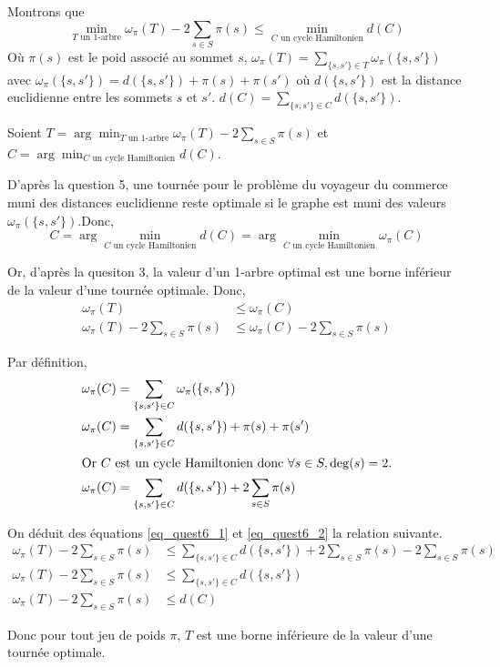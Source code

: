 Montrons que
\begin{equation}\label{eq_quest6}
\min_{T \text{ un 1-arbre}} \omega_{\pi}(T) - 2 \sum_{s \in S} \pi(s) \leq \min_{C \text{ un cycle Hamiltonien}} d(C)
\end{equation}
Où $ \pi(s) $ est le poid associé au sommet $ s $, $ \omega_{\pi}(T) = \sum_{\{s,s'\} \in T} \omega_{\pi}(\{s, s'\}) $ avec $ \omega_{\pi}(\{s, s'\}) = d(\{s, s'\}) + \pi(s) + \pi(s') $ où $ d(\{s, s'\}) $ est la distance euclidienne entre les sommets $ s $ et $ s' $. $ d(C) = \sum_{\{s,s'\} \in C} d(\{s, s'\}) $.

Soient $ T = \arg\min_{T \text{ un 1-arbre}} \omega_{\pi}(T) - 2 \sum_{s \in S} \pi(s)$ et $ C = \arg\min_{C \text{ un cycle Hamiltonien}} d(C) $.

D'après la question 5, une tournée pour le problème du voyageur du commerce muni des distances euclidienne reste optimale si le graphe est muni des valeurs $ \omega_{\pi}(\{s, s'\}) $.Donc,
\begin{equation}
C = \arg\min_{C \text{ un cycle Hamiltonien}} d(C) = \arg\min_{C \text{ un cycle Hamiltonien}} \omega_{\pi}(C)
\end{equation}

Or, d'après la quesiton 3, la valeur d'un 1-arbre optimal est une borne inférieur de la valeur d'une tournée optimale. Donc,
\begin{align}
	\omega_{\pi}(T)                           & \leq \omega_{\pi}(C)                           \\
	\omega_{\pi}(T) - 2 \sum_{s \in S} \pi(s) & \leq \omega_{\pi}(C) - 2 \sum_{s \in S} \pi(s) \label{eq_quest6_1}
\end{align}

Par définition,
\begin{align}
	\omega_{\pi}(C) & =  \sum_{\{s,s'\} \in C} \omega_{\pi}(\{s, s'\})                                  \\
	\omega_{\pi}(C) & =  \sum_{\{s,s'\} \in C} d(\{s, s'\}) + \pi(s) + \pi(s')                          \\ \intertext{Or $ C $ est un cycle Hamiltonien donc $ \forall s \in S, \deg(s) = 2 $.}
	\omega_{\pi}(C) & = \sum_{\{s,s'\} \in C} d(\{s, s'\}) + 2 \sum_{s \in S} \pi(s)\label{eq_quest6_2}
\end{align}

On déduit des équations \eqref{eq_quest6_1} et \eqref{eq_quest6_2} la relation suivante.
\begin{align}
\omega_{\pi}(T) - 2 \sum_{s \in S} \pi(s) & \leq \sum_{\{s,s'\} \in C} d(\{s, s'\}) + 2 \sum_{s \in S} \pi(s) - 2 \sum_{s \in S} \pi(s)\\
\omega_{\pi}(T) - 2 \sum_{s \in S} \pi(s) & \leq \sum_{\{s,s'\} \in C} d(\{s, s'\})\\
\omega_{\pi}(T) - 2 \sum_{s \in S} \pi(s) & \leq d(C)
\end{align}

Donc pour tout jeu de poids $ \pi $, $ T $ est une borne inférieure de la valeur d'une tournée optimale.